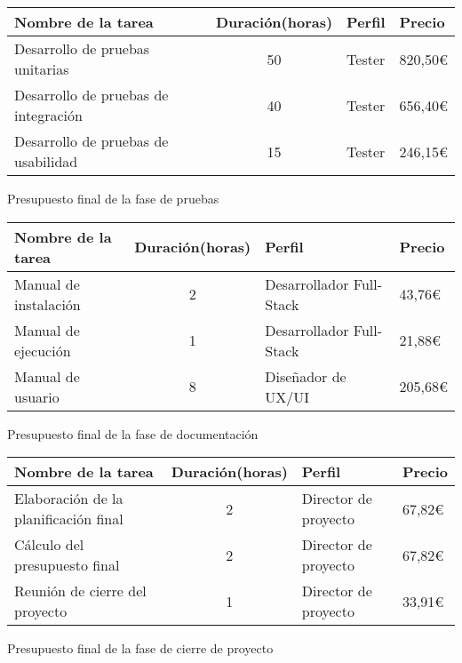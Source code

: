 \begin{planificacion}
	\centering
	\begin{tabular}{ | m{8.5cm} | c | m{2.5cm} |  m{1.5cm} |}
		\hline
		\textbf{Nombre de la tarea}          & \textbf{Duración(horas)} & \textbf{Perfil} & \textbf{Precio} \\\hline
		Desarrollo de pruebas unitarias      & 50                       & Tester          & 820,50€         \\\hline
		Desarrollo de pruebas de integración & 40                       & Tester          & 656,40€         \\\hline
		Desarrollo de pruebas de usabilidad  & 15                       & Tester          & 246,15€         \\\hline
	\end{tabular}
	\caption{Presupuesto final de la fase de pruebas}
\end{planificacion}

\begin{planificacion}
	\centering
	\begin{tabular}{ | m{8.5cm} | c | m{2.5cm} |  m{1.5cm} |}
		\hline
		\textbf{Nombre de la tarea} & \textbf{Duración(horas)} & \textbf{Perfil}          & \textbf{Precio} \\\hline
		Manual de instalación       & 2                        & Desarrollador Full-Stack & 43,76€          \\\hline
		Manual de ejecución         & 1                        & Desarrollador Full-Stack & 21,88€          \\\hline
		Manual de usuario           & 8                        & Diseñador de UX/UI       & 205,68€         \\\hline
	\end{tabular}
	\caption{Presupuesto final de la fase de documentación}
\end{planificacion}

\begin{planificacion}
	\centering
	\begin{tabular}{ | m{8.5cm} | c | m{2.5cm} |  m{1.5cm} |}
		\hline
		\textbf{Nombre de la tarea}           & \textbf{Duración(horas)} & \textbf{Perfil}      & \textbf{Precio} \\\hline
		Elaboración de la planificación final & 2                        & Director de proyecto & 67,82€          \\\hline
		Cálculo del presupuesto final         & 2                        & Director de proyecto & 67,82€          \\\hline
		Reunión de cierre del proyecto        & 1                        & Director de proyecto & 33,91€          \\\hline
	\end{tabular}
	\caption{Presupuesto final de la fase de cierre de proyecto}
\end{planificacion}
